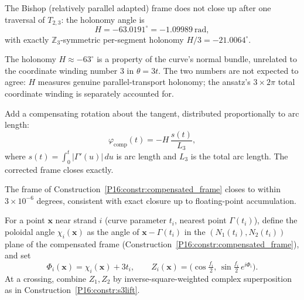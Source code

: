 \begin{proposition}
\label{P16:prop:bishop_holonomy}
The Bishop (relatively parallel adapted) frame does not close up after
one traversal of $T_{2,3}$: the holonomy angle is
\begin{equation}
  H = -63.0191^\circ = -1.09989~\mathrm{rad},
\end{equation}
with exactly $\mathbb{Z}_3$-symmetric per-segment holonomy $H/3=-21.0064^\circ$.
\end{proposition}

\begin{remark}[Distinction from the $\theta=3t$ winding]
\label{P16:rem:holonomy_distinct}
The holonomy $H\approx-63^\circ$ is a property of the curve's normal
bundle, unrelated to the coordinate winding number $3$ in $\theta=3t$.
The two numbers are not expected to agree: $H$ measures genuine
parallel-transport holonomy; the ansatz's $3\times2\pi$ total coordinate
winding is separately accounted for.
\end{remark}

\begin{construction}
\label{P16:constr:compensated_frame}
Add a compensating rotation about the tangent, distributed proportionally
to arc length:
\begin{equation}
  \varphi_{\mathrm{comp}}(t) = -H\,\frac{s(t)}{L_3},
\end{equation}
where $s(t)=\int_0^t|\Gamma'(u)|\,du$ is arc length and $L_3$ is the
total arc length. The corrected frame closes exactly.
\end{construction}

\begin{proposition}
\label{P16:prop:frame_closure}
The frame of Construction~\ref{P16:constr:compensated_frame} closes to within
$3\times10^{-6}$ degrees, consistent with exact closure up to
floating-point accumulation.
\end{proposition}

\begin{construction}
\label{P16:constr:perstrand}
For a point $\mathbf{x}$ near strand $i$ (curve parameter $t_i$,
nearest point $\Gamma(t_i)$), define the poloidal angle $\chi_i(\mathbf{x})$
as the angle of $\mathbf{x}-\Gamma(t_i)$ in the $(N_1(t_i),N_2(t_i))$
plane of the compensated frame (Construction~\ref{P16:constr:compensated_frame}),
and set
\begin{equation}
  \Phi_i(\mathbf{x}) = \chi_i(\mathbf{x}) + 3t_i,
  \qquad
  Z_i(\mathbf{x}) = \bigl(\cos\tfrac{f_i}{2},\,\sin\tfrac{f_i}{2}\,e^{i\Phi_i}\bigr).
\end{equation}
At a crossing, combine $Z_1,Z_2$ by inverse-square-weighted complex
superposition as in Construction~\ref{P16:constr:s3lift}.
\end{construction}

